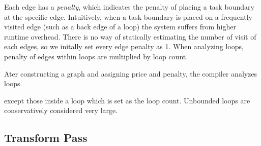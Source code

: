 Each edge has a {\em penalty}, which indicates the penalty of placing a task boundary at
the specific edge. Intuitively, when a task boundary is placed on a frequently visited edge
(such as a back edge of a loop) the system suffers from higher runtime overhead.
There is no way of statically estimating the number of visit of each edges, so we initally set every
edge penalty as 1. When analyzing loops, penalty of edges within loops are multiplied by loop count.

Ater constructing a graph and assigning price and penalty, the compiler analyzes loops. 

except those inside a loop which is set as the loop count. Unbounded loops are conservatively considered very large.







\subsection{Transform Pass}
\label{sec:transform}
